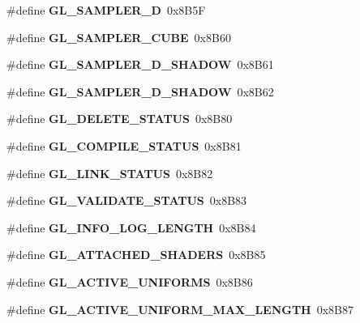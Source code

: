 \begin{DoxyCompactItemize}
\item 
\#define {\bfseries G\+L\+\_\+\+S\+A\+M\+P\+L\+E\+R\+\_\+D}~0x8\+B5\+F\label{_s_d_l__opengl_8h_acbaf67c05cdb5290f748c28ca878e537}

\item 
\#define {\bfseries G\+L\+\_\+\+S\+A\+M\+P\+L\+E\+R\+\_\+\+C\+U\+B\+E}~0x8\+B60\label{_s_d_l__opengl_8h_aefd2fef024ff66a2823dfdc1639fb6ad}

\item 
\#define {\bfseries G\+L\+\_\+\+S\+A\+M\+P\+L\+E\+R\+\_\+D\+\_\+\+S\+H\+A\+D\+O\+W}~0x8\+B61\label{_s_d_l__opengl_8h_a457fd2d13b374061ad772e310fb7d04a}

\item 
\#define {\bfseries G\+L\+\_\+\+S\+A\+M\+P\+L\+E\+R\+\_\+D\+\_\+\+S\+H\+A\+D\+O\+W}~0x8\+B62\label{_s_d_l__opengl_8h_ae021158f10f94bab8f7d9349f90891e5}

\item 
\#define {\bfseries G\+L\+\_\+\+D\+E\+L\+E\+T\+E\+\_\+\+S\+T\+A\+T\+U\+S}~0x8\+B80\label{_s_d_l__opengl_8h_ae8d346453bb18046e6bb687b6006c41b}

\item 
\#define {\bfseries G\+L\+\_\+\+C\+O\+M\+P\+I\+L\+E\+\_\+\+S\+T\+A\+T\+U\+S}~0x8\+B81\label{_s_d_l__opengl_8h_a8b14cf3c9445c50aabe5c7d21b31d215}

\item 
\#define {\bfseries G\+L\+\_\+\+L\+I\+N\+K\+\_\+\+S\+T\+A\+T\+U\+S}~0x8\+B82\label{_s_d_l__opengl_8h_ae644ef6b281c9378fa49d9b1ccefaf31}

\item 
\#define {\bfseries G\+L\+\_\+\+V\+A\+L\+I\+D\+A\+T\+E\+\_\+\+S\+T\+A\+T\+U\+S}~0x8\+B83\label{_s_d_l__opengl_8h_a24b642fbcaffb55c9131a1e7d981e9cc}

\item 
\#define {\bfseries G\+L\+\_\+\+I\+N\+F\+O\+\_\+\+L\+O\+G\+\_\+\+L\+E\+N\+G\+T\+H}~0x8\+B84\label{_s_d_l__opengl_8h_ae77c1e831fd164e9ac6c1a9cdb697ce5}

\item 
\#define {\bfseries G\+L\+\_\+\+A\+T\+T\+A\+C\+H\+E\+D\+\_\+\+S\+H\+A\+D\+E\+R\+S}~0x8\+B85\label{_s_d_l__opengl_8h_aedbcf4c659a8f3ad9714c3171d7dcb66}

\item 
\#define {\bfseries G\+L\+\_\+\+A\+C\+T\+I\+V\+E\+\_\+\+U\+N\+I\+F\+O\+R\+M\+S}~0x8\+B86\label{_s_d_l__opengl_8h_aeb14db2a9d0c7a5aaddec813bbdbfa22}

\item 
\#define {\bfseries G\+L\+\_\+\+A\+C\+T\+I\+V\+E\+\_\+\+U\+N\+I\+F\+O\+R\+M\+\_\+\+M\+A\+X\+\_\+\+L\+E\+N\+G\+T\+H}~0x8\+B87\label{_s_d_l__opengl_8h_a3bcf0a47bfa33bf14698c2b9eb5fa472}


\end{DoxyCompactItemize}
